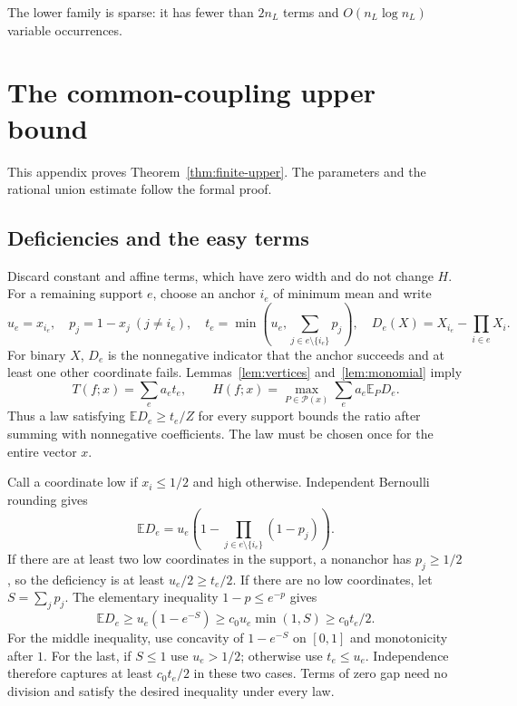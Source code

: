 \documentclass[11pt]{article}
\theoremstyle{remark}
\newcommand{\E}{\mathbb E}
\newcommand{\laws}{\mathcal P}
\begin{document}
The lower family is sparse: it has fewer than $2n_L$ terms and
$O(n_L\log n_L)$ variable occurrences.

\appendix
\section{The common-coupling upper bound}\label{app:coupling}
This appendix proves Theorem~\ref{thm:finite-upper}. The parameters
and the rational union estimate follow the formal proof.

\subsection{Deficiencies and the easy terms}
Discard constant and affine terms, which have zero width and do not
change $H$. For a remaining support $e$, choose an anchor $i_e$ of
minimum mean and write
\begin{equation}\label{eq:deficiency}
 u_e=x_{i_e},\quad p_j=1-x_j\ (j\ne i_e),\quad
 t_e=\min\left(u_e,\sum_{j\in e\setminus\{i_e\}}p_j\right),\quad
 D_e(X)=X_{i_e}-\prod_{i\in e}X_i.
\end{equation}
For binary $X$, $D_e$ is the nonnegative indicator that the anchor
succeeds and at least one other coordinate fails. Lemmas~\ref{lem:vertices}
and~\ref{lem:monomial} imply
\begin{equation}\label{eq:deficiency-gap}
 T(f;x)=\sum_e a_et_e,\qquad
 H(f;x)=\max_{P\in\laws(x)}\sum_e a_e\E_PD_e.
\end{equation}
Thus a law satisfying $\E D_e\ge t_e/Z$ for every support bounds the
ratio after summing with nonnegative coefficients. The law must be
chosen once for the entire vector $x$.

Call a coordinate low if $x_i\le1/2$ and high otherwise. Independent
Bernoulli rounding gives
\[
 \E D_e=u_e\left(1-\prod_{j\in e\setminus\{i_e\}}(1-p_j)\right).
\]
If there are at least two low coordinates in the support, a nonanchor
has $p_j\ge1/2$, so the deficiency is at least $u_e/2\ge t_e/2$.
If there are no low coordinates, let $S=\sum_jp_j$. The elementary
inequality $1-p\le e^{-p}$ gives
\[
 \E D_e\ge u_e(1-e^{-S})\ge c_0u_e\min(1,S)\ge c_0t_e/2.
\]
For the middle inequality, use concavity of $1-e^{-S}$ on $[0,1]$
and monotonicity after $1$. For the last, if $S\le1$ use $u_e>1/2$;
otherwise use $t_e\le u_e$. Independence therefore captures at least
$c_0t_e/2$ in these two cases. Terms of zero gap need no division and
satisfy the desired inequality under every law.
\end{document}
